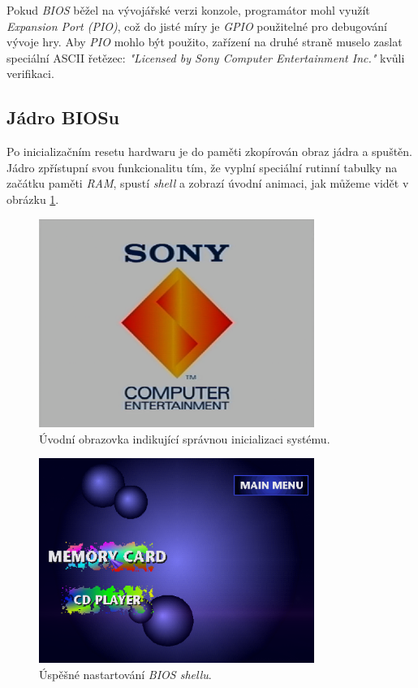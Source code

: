 Pokud \textit{BIOS} běžel na vývojářské verzi konzole, programátor mohl využít \textit{Expansion Port (PIO)}, což
do jisté míry je \textit{GPIO} použitelné pro debugování vývoje hry. Aby \textit{PIO} mohlo být použito,
zařízení na druhé straně muselo zaslat speciální ASCII řetězec: \textit{"Licensed by Sony Computer Entertainment Inc."} kvůli verifikaci.

\subsection{Jádro BIOSu}

Po inicializačním resetu hardwaru je do paměti zkopírován obraz jádra a spuštěn. 
Jádro zpřístupní svou funkcionalitu tím, že vyplní speciální rutinní tabulky na začátku paměti \textit{RAM}, spustí \textit{shell} a zobrazí úvodní animaci, jak můžeme vidět v obrázku \ref{boot-screen}.

\begin{figure}[hbt]
    \centering
    \includegraphics[width=0.8\textwidth]{obrazky-figures/boot-screen.png}
    \caption[Korektní inicializace \textit{BIOSu}]{Úvodní obrazovka indikující správnou inicializaci systému.}
    \label{boot-screen}
\end{figure}

\begin{figure}[hbt]
    \centering
    \includegraphics[width=0.8\textwidth]{obrazky-figures/bios-shell.png}
    \caption[\textit{BIOS shell}]{Úspěšné nastartování \textit{BIOS shellu}.}
    \label{bios-shell}
\end{figure}

